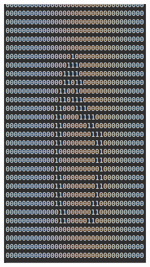 \begin{figure}[htbp]
	\centering
	\begin{subfigure}[b]{0.2\linewidth}
		\includegraphics*[width=1\linewidth]{pics/wrong_output_predict0.png}
		\label{fig:sub1}
	\end{subfigure}
	\hfill
	\begin{subfigure}[b]{0.2\linewidth}

\end{subfigure}
\end{figure}

